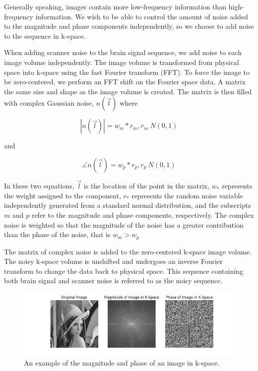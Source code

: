 Generally speaking, images contain more low-frequency information than high-frequency information. We wish to be able to control the amount of noise added to the magnitude and phase components independently, so we choose to add noise to the sequence in k-space.

When adding scanner noise to the brain signal sequence, we add noise to each image volume independently. The image volume is transformed from physical space into k-space using the fast Fourier transform (FFT). To force the image to be zero-centered, we perform an FFT shift on the Fourier space data. A matrix the same size and shape as the image volume is created. The matrix is then filled with complex Gaussian noise, $n(\vec{l})$ where

\begin{equation}
|n(\vec{l})| = w_m * r_m, r_m~N(0,1)
\end{equation}

\noindent and

\begin{equation}
\angle n(\vec{l}) = w_p * r_p, r_p~N(0,1)
\end{equation}

\noindent In these two equations, $\vec{l}$ is the location of the point in the matrix, $w_*$ represents the weight assigned to the component, $r_*$ represents the random noise variable independently generated from a standard normal distribution, and the subscripts $m$ and $p$ refer to the magnitude and phase components, respectively. The complex noise is weighted so that the magnitude of the noise has a greater contribution than the phase of the noise, that is $w_m > w_p$ 

The matrix of complex noise is added to the zero-centered k-space image volume. The noisy k-space volume is unshifted and undergoes an inverse Fourier transform to change the data back to physical space. This sequence containing both brain signal and scanner noise is referred to as the noisy sequence.

\begin{figure}
\centering
\includegraphics[width=.9\textwidth]{5/fft_example.png}
\caption{An example of the magnitude and phase of an image in k-space.}
\label{ch5:fft_example}
\end{figure}

